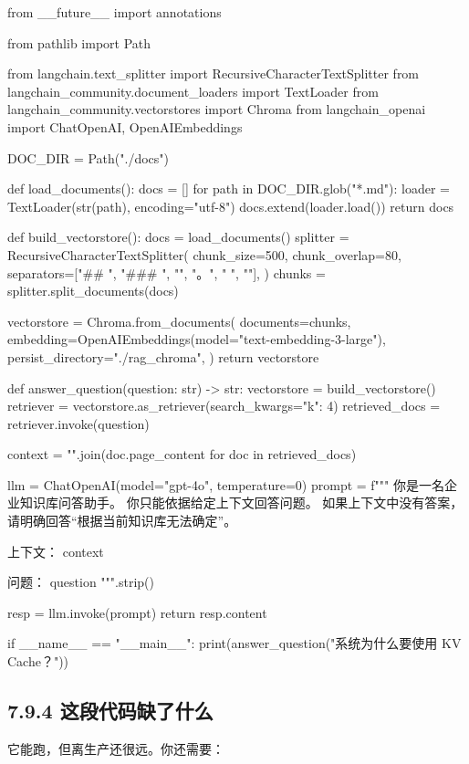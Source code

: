 \begin{codeblock}
from __future__ import annotations

from pathlib import Path

from langchain.text_splitter import RecursiveCharacterTextSplitter
from langchain_community.document_loaders import TextLoader
from langchain_community.vectorstores import Chroma
from langchain_openai import ChatOpenAI, OpenAIEmbeddings


DOC_DIR = Path("./docs")


def load_documents():
    docs = []
    for path in DOC_DIR.glob("*.md"):
        loader = TextLoader(str(path), encoding="utf-8")
        docs.extend(loader.load())
    return docs


def build_vectorstore():
    docs = load_documents()
    splitter = RecursiveCharacterTextSplitter(
        chunk_size=500,
        chunk_overlap=80,
        separators=["\n## ", "\n### ", "\n", "。", " ", ""],
    )
    chunks = splitter.split_documents(docs)

    vectorstore = Chroma.from_documents(
        documents=chunks,
        embedding=OpenAIEmbeddings(model="text-embedding-3-large"),
        persist_directory="./rag_chroma",
    )
    return vectorstore


def answer_question(question: str) -> str:
    vectorstore = build_vectorstore()
    retriever = vectorstore.as_retriever(search_kwargs={"k": 4})
    retrieved_docs = retriever.invoke(question)

    context = "\n\n".join(doc.page_content for doc in retrieved_docs)

    llm = ChatOpenAI(model="gpt-4o", temperature=0)
    prompt = f"""
你是一名企业知识库问答助手。
你只能依据给定上下文回答问题。
如果上下文中没有答案，请明确回答``根据当前知识库无法确定''。

上下文：
{context}

问题：
{question}
""".strip()

    resp = llm.invoke(prompt)
    return resp.content


if __name__ == "__main__":
    print(answer_question("系统为什么要使用 KV Cache？"))
\end{codeblock}

\subsection{7.9.4 这段代码缺了什么}

它能跑，但离生产还很远。你还需要：


